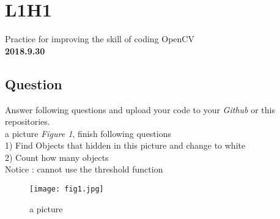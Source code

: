 \documentclass{article}
\begin{document}
\section*{L1H1} 

Practice for improving the skill of coding OpenCV\\

\textbf{2018.9.30}

\subsection*{Question}

Answer following questions and upload your code to your \emph{Github} or this repositories.\\

 a picture \emph{Figure 1}, finish following questions\\

1) Find Objects that hidden in this picture and change to white\\

2) Count how many objects\\

\noindent\textsf{Notice} : cannot use the threshold function

\begin{figure}[h]
\texttt{[image: fig1.jpg]}
\centering
\caption{a picture}
\end{figure}
\end{document}
